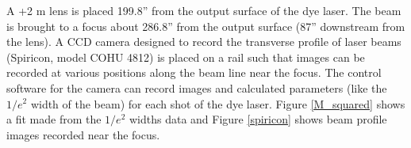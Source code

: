 A +2 m lens is placed 199.8'' from the output surface of the dye laser. The beam is brought to a focus about 286.8'' from the output surface (87'' downstream from the lens). A CCD camera designed to record the transverse profile of laser beams (Spiricon, model COHU 4812) is placed on a rail such that images can be recorded at various positions along the beam line near the focus. The control software for the camera can record images and calculated parameters (like the $1/e^2$ width of the beam) for each shot of the dye laser. Figure \ref{M_squared} shows a fit made from the $1/e^2$ widths data and Figure \ref{spiricon} shows beam profile images recorded near the focus.
